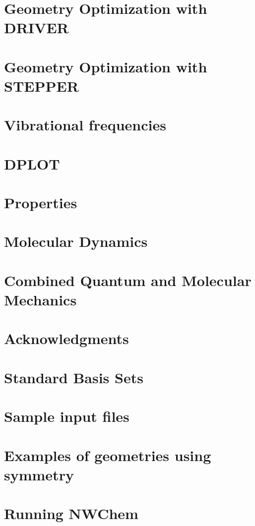 \chapter{Geometry Optimization with DRIVER}


\chapter{Geometry Optimization with STEPPER}


\chapter{Vibrational frequencies}


\chapter{DPLOT}


\chapter{Properties}


\chapter{Molecular Dynamics}


\chapter{Combined Quantum and Molecular Mechanics}


\clearpage
\chapter{Acknowledgments}

\clearpage

\appendix

\chapter{Standard Basis Sets}


\chapter{Sample input files}


\chapter{Examples of geometries using symmetry}


\chapter{Running NWChem}



